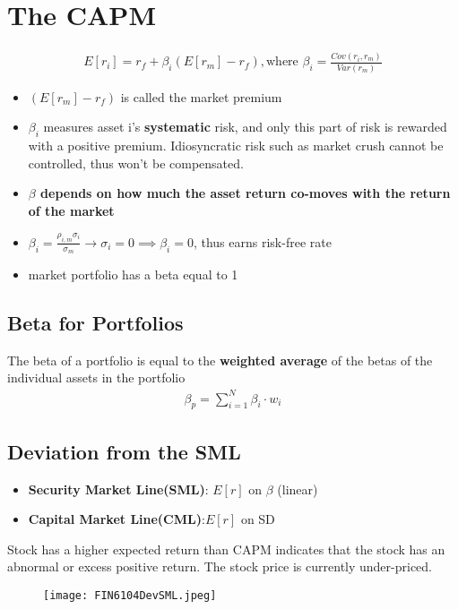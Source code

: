 \documentclass{article}
\theoremstyle{definition}
\theoremstyle{thrm}
\theoremstyle{lma}
\theoremstyle{ppst}
\theoremstyle{crlr}
\begin{document}
\section{The CAPM}
\begin{align*}
	E[r_i] = r_f+\beta_i(E[r_m]-r_f), \text{where }\beta_i = \frac{Cov(r_i,r_m)}{Var(r_m)}
\end{align*}
\begin{itemize}
	\item $(E[r_m]-r_f)$ is called the market premium
	\item $\beta_i$ measures asset i's \textbf{systematic} risk, and only this part of risk is rewarded with a positive premium. Idiosyncratic risk such as market crush cannot be controlled, thus won't be compensated. 
	\item \textbf{$\beta$ depends on how much the asset return co-moves with the return of the market}
	\item $\beta_i = \frac{\rho_{i,m}\sigma_i}{\sigma_m}\to \sigma_i=0\implies \beta_i=0$, thus earns risk-free rate
	\item market portfolio has a beta equal to 1
\end{itemize}
\subsection{Beta for Portfolios}
The beta of a portfolio is equal to the \textbf{weighted average} of the betas of the individual assets in the portfolio
\begin{align*}
	\beta_p = \sum_{i=1}^N\beta_i\cdot w_i
\end{align*}

\subsection{Deviation from the SML}
\begin{itemize}
	\item \textbf{Security Market Line(SML)}: $E[r]$ on $\beta$ (linear)
	\item \textbf{Capital Market Line(CML)}:$E[r]$ on SD
\end{itemize}
Stock has a higher expected return than CAPM indicates that the stock has an abnormal or excess positive return. The stock price is currently under-priced. 
\begin{figure}[ht]
	\centering
    \texttt{[image: FIN6104DevSML.jpeg]}
\end{figure} 
\end{document}
